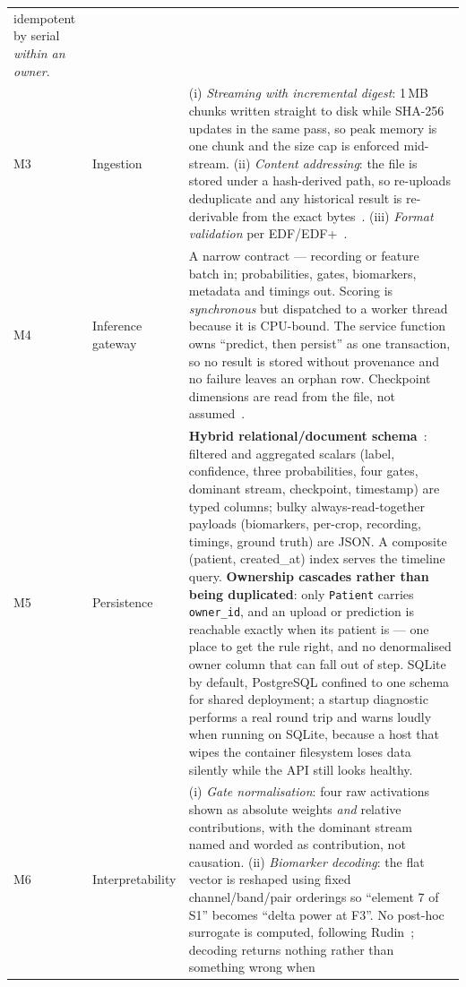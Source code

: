 \documentclass[11pt,a4paper]{article}
\newcommand{\code}[1]{\texttt{#1}}
\begin{document}
\begin{table}[H]
\begin{tabularx}{\linewidth}{@{}C{0.55cm} L{2.4cm} Y@{}}
idempotent by serial \emph{within an owner}. \\
\addlinespace[2pt]
M3 & Ingestion &
(i) \emph{Streaming with incremental digest}: 1\,MB chunks written straight to
disk while SHA-256 updates in the same pass, so peak memory is one chunk and the
size cap is enforced mid-stream. (ii) \emph{Content addressing}: the file is
stored under a hash-derived path, so re-uploads deduplicate and any historical
result is re-derivable from the exact bytes~\cite{amershi2019}. (iii)
\emph{Format validation} per EDF/EDF+~\cite{kemp1992,kemp2003}. \\
\addlinespace[2pt]
M4 & Inference gateway &
A narrow contract --- recording or feature batch in; probabilities, gates,
biomarkers, metadata and timings out. Scoring is \emph{synchronous} but
dispatched to a worker thread because it is CPU-bound. The service function owns
``predict, then persist'' as one transaction, so no result is stored without
provenance and no failure leaves an orphan row. Checkpoint dimensions are read
from the file, not assumed~\cite{sculley2015}. \\
\addlinespace[2pt]
M5 & Persistence &
\textbf{Hybrid relational/document schema}~\cite{kleppmann2017}: filtered and
aggregated scalars (label, confidence, three probabilities, four gates, dominant
stream, checkpoint, timestamp) are typed columns; bulky always-read-together
payloads (biomarkers, per-crop, recording, timings, ground truth) are JSON. A
composite (patient, created\_at) index serves the timeline query.
\textbf{Ownership cascades rather than being duplicated}: only \code{Patient}
carries \code{owner\_id}, and an upload or prediction is reachable exactly when
its patient is --- one place to get the rule right, and no denormalised owner
column that can fall out of step. SQLite by
default, PostgreSQL confined to one schema for shared deployment; a startup
diagnostic performs a real round trip and warns loudly when running on SQLite,
because a host that wipes the container filesystem loses data silently while the
API still looks healthy. \\
\addlinespace[2pt]
M6 & Interpretability &
(i) \emph{Gate normalisation}: four raw activations shown as absolute weights
\emph{and} relative contributions, with the dominant stream named and worded as
contribution, not causation. (ii) \emph{Biomarker decoding}: the flat vector is
reshaped using fixed channel/band/pair orderings so ``element 7 of S1'' becomes
``delta power at F3''. No post-hoc surrogate is computed, following
Rudin~\cite{rudin2019}; decoding returns nothing rather than something wrong when

\end{tabularx}
\end{table}
\end{document}
